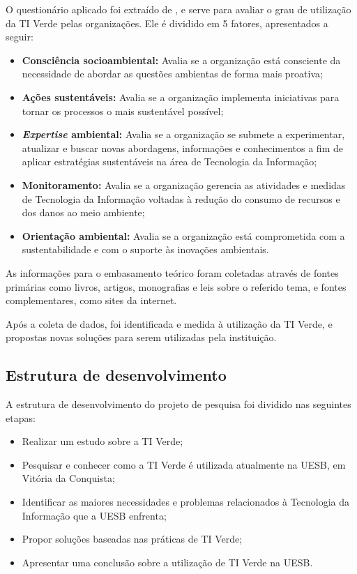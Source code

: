 O questionário aplicado foi extraído de , e serve para avaliar o grau de utilização da TI Verde pelas organizações. Ele é dividido em 5 fatores, apresentados a seguir: 
\begin{itemize}
    \item  \textbf{Consciência socioambiental:} Avalia se a organização está consciente da necessidade de abordar as questões ambientas de forma mais proativa;
    \item \textbf{Ações sustentáveis:} Avalia se a organização implementa iniciativas para tornar os processos o mais sustentável possível;
    \item \textbf{\textit{Expertise} ambiental:} Avalia se a organização se submete a experimentar, atualizar e buscar novas abordagens, informações e conhecimentos a fim de aplicar estratégias sustentáveis na área de Tecnologia da Informação;
    \item \textbf{Monitoramento:} Avalia se a organização gerencia as atividades e medidas de Tecnologia da Informação voltadas à redução do consumo de recursos e dos danos ao meio ambiente;
    \item \textbf{Orientação ambiental:} Avalia se a organização está comprometida com a sustentabilidade e com o suporte às inovações ambientais.
\end{itemize}

As informações para o embasamento teórico foram coletadas através de fontes primárias como livros, artigos, monografias e leis sobre o referido tema, e fontes complementares, como sites da internet. 

Após a coleta de dados, foi identificada e medida à utilização da TI Verde, e propostas novas soluções para serem utilizadas pela instituição.

\subsection{Estrutura de desenvolvimento}
A estrutura de desenvolvimento do projeto de pesquisa foi dividido nas seguintes etapas:

\begin{itemize}
  \item Realizar um estudo sobre a TI Verde;
  \item Pesquisar e conhecer como a TI Verde é utilizada atualmente na UESB, em Vitória da Conquista;
  \item Identificar as maiores necessidades e problemas relacionados à Tecnologia da Informação que a UESB enfrenta;
  \item Propor soluções baseadas nas práticas de TI Verde;
  \item Apresentar uma conclusão sobre a utilização de TI Verde na UESB.
\end{itemize}
